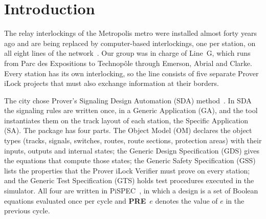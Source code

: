 \documentclass[a4paper,12pt]{article}
\newcommand{\code}[1]{\texttt{\detokenize{#1}}}
\begin{document}
\hypersetup{pageanchor=true}

\clearpage
{}
\pagestyle{empty}
\thispagestyle{empty}
{
    \hypersetup{linkcolor=ProverMadison}
    \tableofcontents
    \thispagestyle{empty}
}
\clearpage

\pagestyle{fancy}

\section{Introduction}
\label{sec:intro}

The relay interlockings of the Metropolis metro were installed almost forty years ago and are being replaced by computer-based interlockings, one per station, on all eight lines of the network~\cite{metropolis_dossier}. Our group was in charge of Line~G, which runs from Parc des Expositions to Technop\^ole through Emerson, Abrial and Clarke. Every station has its own interlocking, so the line consists of five separate Prover iLock projects that must also exchange information at their borders.

The city chose Prover's Signaling Design Automation (SDA) method~\cite{prover_sda}. In SDA the signaling rules are written once, in a Generic Application (GA), and the tool instantiates them on the track layout of each station, the Specific Application (SA). The package \code{Metropolis_GA} has four parts. The Object Model (OM) declares the object types (tracks, signals, switches, routes, route sections, protection areas) with their inputs, outputs and internal states; the Generic Design Specification (GDS) gives the equations that compute those states; the Generic Safety Specification (GSS) lists the properties that the Prover iLock Verifier must prove on every station; and the Generic Test Specification (GTS) holds test procedures executed in the simulator. All four are written in PiSPEC~\cite{pispec_ref}, in which a design is a set of Boolean equations evaluated once per cycle and \textbf{PRE}~$e$ denotes the value of $e$ in the previous cycle.
\end{document}
